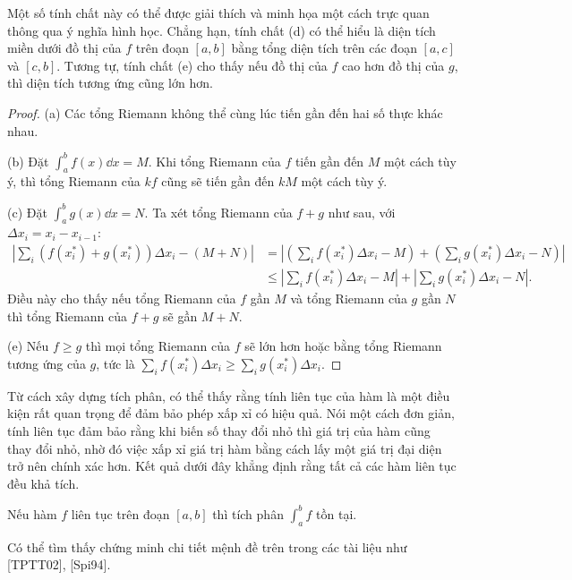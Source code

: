 Một số tính chất này có thể được giải thích và minh họa một cách trực quan thông qua ý nghĩa hình học. Chẳng hạn, tính chất (d) có thể hiểu là diện tích miền dưới đồ thị của $f$ trên đoạn $[a, b]$ bằng tổng diện tích trên các đoạn $[a, c]$ và $[c, b]$. Tương tự, tính chất (e) cho thấy nếu đồ thị của $f$ cao hơn đồ thị của $g$, thì diện tích tương ứng cũng lớn hơn.

\begin{proof}
    (a) Các tổng Riemann không thể cùng lúc tiến gần đến hai số thực khác nhau.
    
    (b) Đặt $\int_a^b f(x) \dd x = M$. Khi tổng Riemann của $f$ tiến gần đến $M$ một cách tùy ý, thì tổng Riemann của $kf$ cũng sẽ tiến gần đến $kM$ một cách tùy ý.
    
    (c) Đặt $\int_a^b g(x) \dd x = N$. Ta xét tổng Riemann của $f+g$ như sau, với $\Delta x_i = x_i - x_{i-1}$:
    \begin{align*}
        \left| \sum_{i} (f(x_i^*) + g(x_i^*))\Delta x_i - (M+N) \right| &= \left| \left(\sum_i f(x_i^*)\Delta x_i - M\right) + \left(\sum_i g(x_i^*)\Delta x_i - N\right) \right| \\
        &\le \left| \sum_i f(x_i^*)\Delta x_i - M \right| + \left| \sum_i g(x_i^*)\Delta x_i - N \right|.
    \end{align*}
    Điều này cho thấy nếu tổng Riemann của $f$ gần $M$ và tổng Riemann của $g$ gần $N$ thì tổng Riemann của $f+g$ sẽ gần $M+N$.
    
    (e) Nếu $f \ge g$ thì mọi tổng Riemann của $f$ sẽ lớn hơn hoặc bằng tổng Riemann tương ứng của $g$, tức là $\sum_i f(x_i^*)\Delta x_i \ge \sum_i g(x_i^*)\Delta x_i$.
\end{proof}

Từ cách xây dựng tích phân, có thể thấy rằng tính liên tục của hàm là một điều kiện rất quan trọng để đảm bảo phép xấp xỉ có hiệu quả. Nói một cách đơn giản, tính liên tục đảm bảo rằng khi biến số thay đổi nhỏ thì giá trị của hàm cũng thay đổi nhỏ, nhờ đó việc xấp xỉ giá trị hàm bằng cách lấy một giá trị đại diện trở nên chính xác hơn. Kết quả dưới đây khẳng định rằng tất cả các hàm liên tục đều khả tích.

\begin{theorem}
    Nếu hàm $f$ liên tục trên đoạn $[a, b]$ thì tích phân $\int_a^b f$ tồn tại.
\end{theorem}

Có thể tìm thấy chứng minh chi tiết mệnh đề trên trong các tài liệu như
[TPTT02], [Spi94].

